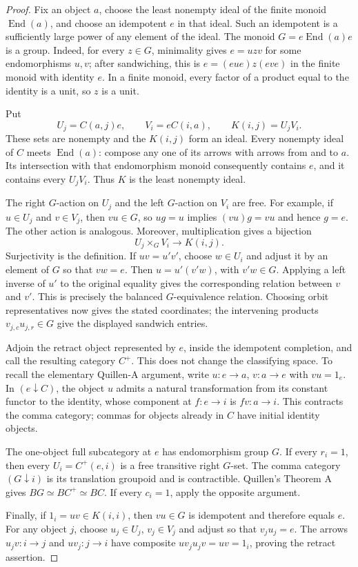 \begin{proof}
Fix an object $a$, choose the least nonempty ideal of the finite
monoid $\operatorname{End}(a)$, and choose an idempotent $e$ in
that ideal. Such an idempotent is a sufficiently large power of
any element of the ideal. The monoid
$G=e\operatorname{End}(a)e$ is a group. Indeed, for every
$z\in G$, minimality gives $e=u z v$ for some endomorphisms
$u,v$; after sandwiching, this is
$e=(eue)z(eve)$ in the finite monoid with identity $e$.
In a finite monoid, every factor of a product equal to the
identity is a unit, so $z$ is a unit.

Put
\[
 U_j=C(a,j)e,\qquad V_i=eC(i,a),\qquad K(i,j)=U_jV_i.
\]
These sets are nonempty and the $K(i,j)$ form an ideal.
Every nonempty ideal of $C$ meets $\operatorname{End}(a)$:
compose any one of its arrows with arrows from and to $a$.
Its intersection with that endomorphism monoid consequently
contains $e$, and it contains every $U_jV_i$. Thus $K$ is the
least nonempty ideal.

The right $G$-action on $U_j$ and the left $G$-action on $V_i$
are free. For example, if $u\in U_j$ and $v\in V_j$, then
$vu\in G$, so $ug=u$ implies $(vu)g=vu$ and hence $g=e$.
The other action is analogous. Moreover, multiplication gives
a bijection
\[
 U_j\times_G V_i\longrightarrow K(i,j).
\]
Surjectivity is the definition. If $uv=u'v'$, choose $w\in U_i$
and adjust it by an element of $G$ so that $vw=e$.
Then $u=u'(v'w)$, with $v'w\in G$. Applying a left inverse
of $u'$ to the original equality gives the corresponding
relation between $v$ and $v'$. This is precisely the balanced
$G$-equivalence relation. Choosing orbit representatives now
gives the stated coordinates; the intervening products
$v_{j,c}u_{j,r}\in G$ give the displayed sandwich entries.

Adjoin the retract object represented by $e$, inside the
idempotent completion, and call the resulting category $C^+$.
This does not change the classifying space. To recall the
elementary Quillen-A argument, write
$u:e\to a$, $v:a\to e$ with $vu=1_e$.
In $(e\downarrow C)$, the object $u$ admits a natural
transformation from its constant functor to the identity,
whose component at $f:e\to i$ is $fv:a\to i$.
This contracts the comma category; commas for objects already
in $C$ have initial identity objects.

The one-object full subcategory at $e$ has endomorphism group
$G$. If every $r_i=1$, then every $U_i=C^+(e,i)$ is a free
transitive right $G$-set. The comma category $(G\downarrow i)$
is its translation groupoid and is contractible. Quillen's
Theorem A gives $BG\simeq BC^+\simeq BC$.
If every $c_i=1$, apply the opposite argument.

Finally, if $1_i=uv\in K(i,i)$, then $vu\in G$ is idempotent
and therefore equals $e$. For any object $j$, choose
$u_j\in U_j$, $v_j\in V_j$ and adjust so that $v_ju_j=e$.
The arrows $u_jv:i\to j$ and $uv_j:j\to i$ have composite
$uv_ju_jv=uv=1_i$, proving the retract assertion.
\end{proof}

